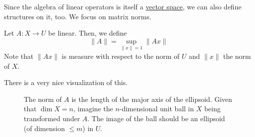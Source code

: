   Since the algebra of linear operators is itself a \hyperref[def:vector-space]{vector space}, we can also define structures on it, too. We focus on matrix norms. 

  \begin{definition}
    \label{def:operator-norm-2}
    Let $A: X \to U$ be linear. Then, we define
    \begin{equation}
      \|A\| = \sup_{\|x\|=1} \|A x\|
    \end{equation}
    Note that $\|A x\|$ is measure with respect to the norm of $U$ and $\|x\|$ the norm of $X$. 
  \end{definition}

  There is a very nice visualization of this. 

  \begin{figure}[H]
    \centering 
    \caption{The norm of $A$ is the length of the major axis of the ellipsoid. Given that $\dim{X}=n$, imagine the $n$-dimensional unit ball in $X$ being transformed under $A$. The image of the ball should be an ellipsoid (of dimension $\leq m$) in $U$. } 
    \label{fig:operator_norm}
  \end{figure}

